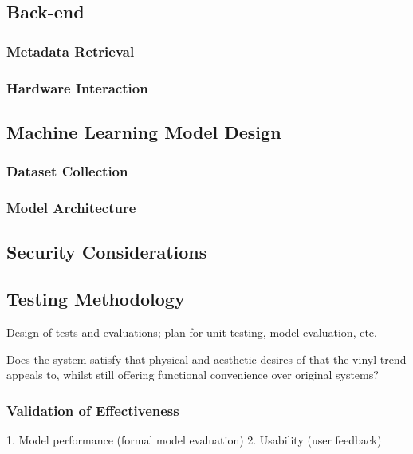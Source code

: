       \subsection{Back-end}
  
          \subsubsection{Metadata Retrieval}
          
          \subsubsection{Hardware Interaction}
      
      \subsection{Machine Learning Model Design}
          \subsubsection{Dataset Collection}
  
          \subsubsection{Model Architecture}
  
      \subsection{Security Considerations}
  
      \subsection{Testing Methodology}
          Design of tests and evaluations; plan for unit testing, model evaluation, etc.
  
          Does the system satisfy that physical and aesthetic desires of that the vinyl trend appeals to, whilst still offering functional convenience over original systems?
  
          \subsubsection{Validation of Effectiveness}
              1. Model performance (formal model evaluation)
              2. Usability (user feedback)
  
